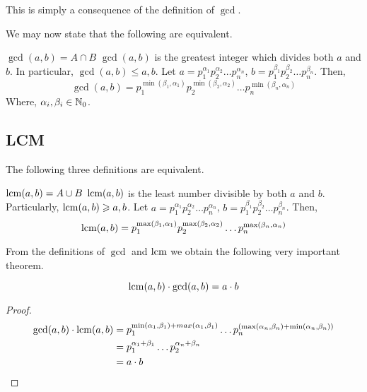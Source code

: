 This is simply a consequence of the definition of \(\gcd\).

\begin{definition}
    [GCD]
    We may now state that the following are equivalent.
    \begin{itemize}
        \ii \( \gcd(a,b) = A \cap B  \)     
        \ii \(\gcd(a,b)\) is the greatest integer which divides both \(a\) and \(b\). In particular, \(\gcd(a,b) \le a, b\).
        \ii Let \(a = p_{1} ^{\alpha_1} p_{2} ^{\alpha_2} \ldots p_{n}^{\alpha_n}\), \(b = p_{1} ^{\beta_1} p_{2} ^{\beta_2} \ldots p_{n}^{\beta_n}\). Then, \[\gcd(a,b)= p_{1} ^{\min(\beta_1, \alpha_1)} p_{2} ^{\min(\beta_2, \alpha_2)} \ldots p_{n}^{\min(\beta_n, \alpha_n)} \]
        Where, \(\alpha_i, \beta_i \in \mathbb N_0 \).
    \end{itemize}
    
\end{definition}

\subsection{LCM}

\begin{definition}
    [LCM]
    The following three definitions are equivalent.
    \begin{itemize}
        \ii \(\operatorname*{lcm}(a,b) = A \cup B\)
        \ii \(\operatorname*{lcm}(a,b)\) is the least number divisible by both \(a\) and \(b\). Particularly, \(\operatorname*{lcm}(a,b) \geqslant a,b\).
        \ii Let \(a = p_{1} ^{\alpha_1} p_{2} ^{\alpha_2} \ldots p_{n}^{\alpha_n}\), \(b = p_{1} ^{\beta_1} p_{2} ^{\beta_2} \ldots p_{n}^{\beta_n}\). Then, \[\operatorname*{lcm}(a,b)= p_{1} ^{\max(\beta_1, \alpha_1)} p_{2} ^{\max(\beta_2, \alpha_2)} \ldots p_{n}^{\max(\beta_n, \alpha_n)} \]
    \end{itemize}
    
    
\end{definition}


From the definitions of \(\gcd\) and \(\operatorname*{lcm}\) we obtain the following very important theorem.

\begin{theorem}
    \[\operatorname*{lcm}(a,b)\cdot \gcd(a,b) = a\cdot b \]
\end{theorem}

\begin{proof}
    
    
    \begin{align*}
        \gcd(a,b) \cdot \operatorname*{lcm}(a,b) &= p_{1}^{\min(\alpha_1,\beta_1) + max(\alpha_1,\beta_1)} \ldots p_{n}^{(\max(\alpha_n, \beta_n) + \min(\alpha_n, \beta_n))}\\
        &= p_{1}^{\alpha_1 + \beta_1} \ldots p_2^{\alpha_n + \beta_n}\\
        &= a\cdot b
    \end{align*}    
    
    
\end{proof}



